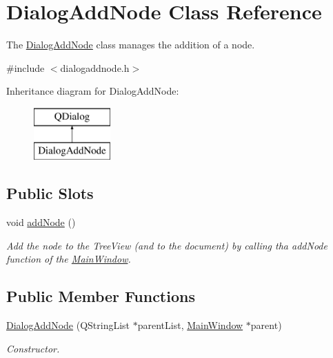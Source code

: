 \hypertarget{classDialogAddNode}{\section{Dialog\-Add\-Node Class Reference}
\label{classDialogAddNode}
}


The \hyperlink{classDialogAddNode}{Dialog\-Add\-Node} class manages the addition of a node.  




{\ttfamily \#include $<$dialogaddnode.\-h$>$}

Inheritance diagram for Dialog\-Add\-Node\-:\begin{figure}[H]
\begin{center}
\leavevmode
\includegraphics[height=2.000000cm]{classDialogAddNode}
\end{center}
\end{figure}
\subsection*{Public Slots}
\begin{DoxyCompactItemize}
\item 
\hypertarget{classDialogAddNode_a2335a5fef409594fd2e73330870b12c6}{void \hyperlink{classDialogAddNode_a2335a5fef409594fd2e73330870b12c6}{add\-Node} ()}\label{classDialogAddNode_a2335a5fef409594fd2e73330870b12c6}

\begin{DoxyCompactList}\small\item\em Add the node to the Tree\-View (and to the document) by calling tha add\-Node function of the \hyperlink{classMainWindow}{Main\-Window}. \end{DoxyCompactList}\end{DoxyCompactItemize}
\subsection*{Public Member Functions}
\begin{DoxyCompactItemize}
\item 
\hyperlink{classDialogAddNode_a9f573b099436b835e4c660e81e361f75}{Dialog\-Add\-Node} (Q\-String\-List $\ast$parent\-List, \hyperlink{classMainWindow}{Main\-Window} $\ast$parent)
\begin{DoxyCompactList}\small\item\em Constructor. \end{DoxyCompactList}\end{DoxyCompactItemize}
